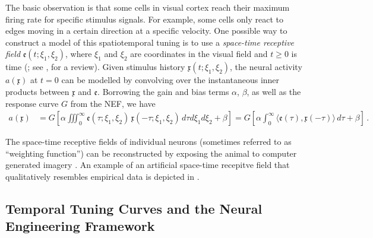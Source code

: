 The basic observation is that some cells in visual cortex reach their maximum firing rate for specific stimulus signals.
For example, some cells only react to edges moving in a certain direction at a specific velocity.
One possible way to construct a model of this spatiotemporal tuning is to use a \emph{space-time receptive field} $\mathfrak{e}(t; \xi_1, \xi_2)$, where $\xi_1$ and $\xi_2$ are coordinates in the visual field and $t \geq 0$ is time (\cite{watson1983look,adelson1985spatiotemporal}; see \cite{carandini1999linearity}, for a review).
Given stimulus history $\mathfrak{x}(t; \xi_1, \xi_2)$, the neural activity $a(\mathfrak{x})$ at $t = 0$ can be modelled by convolving over the instantaneous inner products between $\mathfrak{x}$ and $\mathfrak{e}$.
Borrowing the gain and bias terms $\alpha$, $\beta$, as well as the response curve $G$ from the NEF, we have
\begin{align}
	a(\mathfrak{x})
		&= G\left[\alpha \! \iiint_0^\infty \!\!\! \mathfrak{e}(\tau; \xi_1, \xi_2) \, \mathfrak{x}(-\tau; \xi_1, \xi_2) \,
		\mathit{d \tau} \mathit{d \xi_1} \mathit{d \xi_2} + \beta \right]
		 = G\left[\alpha \! \int_0^\infty \!\!\! \big\langle \mathfrak{e}(\tau), \mathfrak{x}(-\tau) \big\rangle \,
		 \mathit{d \tau} + \beta \right] \, .
	\label{eqn:tuning_curve_from_temporal_receptive_field}
\end{align}

The space-time receptive fields of individual neurons (sometimes referred to as \enquote{weighting function}) can be reconstructed by exposing the animal to computer generated imagery \citep{mclean1989contribution}.
An example of an artificial space-time recepitve field that qualitatively resembles empirical data \citep[cf.][]{deangelis1993spatiotemporal} is depicted in .

\subsection{Temporal Tuning Curves and the Neural Engineering Framework}
\label{sec:temporal_tuning_nef}

